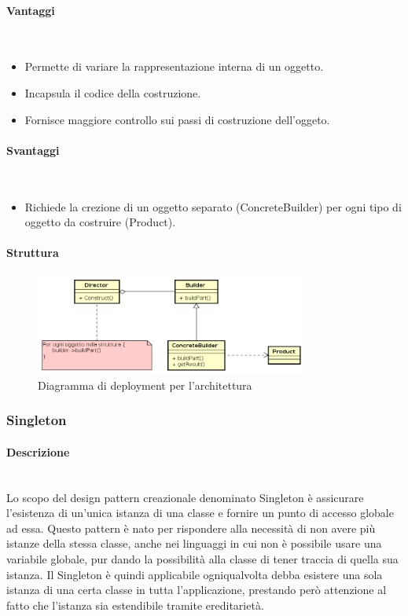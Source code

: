 \paragraph{Vantaggi} \mbox{} \\
\begin{itemize}
\item Permette di variare la rappresentazione interna di un oggetto.
\item Incapsula il codice della costruzione.
\item Fornisce maggiore controllo sui passi di costruzione dell'oggeto.
\end{itemize}
\paragraph{Svantaggi} \mbox{} \\
\begin{itemize}
\item Richiede la crezione di un oggetto separato (ConcreteBuilder) per ogni tipo di oggetto da costruire (Product).
\end{itemize}
\paragraph{Struttura}
\begin{figure}[h]
\centering
\includegraphics[width=0.8\textwidth]{res/sections/backend/builder.png}
\caption{Diagramma di deployment per l'architettura}
\end{figure}
\subsubsection{Singleton}
\paragraph{Descrizione} \mbox{} \\
Lo scopo del design pattern creazionale denominato Singleton è assicurare l’esistenza di un'unica istanza di una classe e fornire un punto di accesso globale ad essa. Questo pattern è nato per rispondere alla necessità di non avere più istanze della stessa classe, anche nei linguaggi in cui non è possibile usare una variabile globale, pur dando la possibilità alla classe di tener traccia di quella sua istanza. Il Singleton è quindi applicabile ogniqualvolta debba esistere una sola istanza di una certa classe in tutta l’applicazione, prestando però attenzione al fatto che l’istanza sia estendibile tramite ereditarietà.
